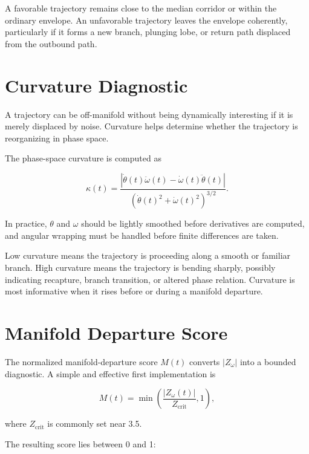 \documentclass[11pt]{article}
\begin{document}
A favorable trajectory remains close to the median corridor or within the ordinary envelope. An unfavorable trajectory leaves the envelope coherently, particularly if it forms a new branch, plunging lobe, or return path displaced from the outbound path.

\section{Curvature Diagnostic}

A trajectory can be off-manifold without being dynamically interesting if it is merely displaced by noise. Curvature helps determine whether the trajectory is reorganizing in phase space.

The phase-space curvature is computed as

\begin{equation}
\kappa(t) =
\frac{\left|\dot{\theta}(t)\ddot{\omega}(t)-\dot{\omega}(t)\ddot{\theta}(t)\right|}
{\left(\dot{\theta}(t)^2+\dot{\omega}(t)^2\right)^{3/2}}.
\end{equation}

In practice, \(\theta\) and \(\omega\) should be lightly smoothed before derivatives are computed, and angular wrapping must be handled before finite differences are taken.

Low curvature means the trajectory is proceeding along a smooth or familiar branch. High curvature means the trajectory is bending sharply, possibly indicating recapture, branch transition, or altered phase relation. Curvature is most informative when it rises before or during a manifold departure.

\section{Manifold Departure Score}

The normalized manifold-departure score \(M(t)\) converts \(|Z_{\omega}|\) into a bounded diagnostic. A simple and effective first implementation is

\begin{equation}
M(t) = \min\left(\frac{|Z_{\omega}(t)|}{Z_{\mathrm{crit}}},1\right),
\end{equation}

where \(Z_{\mathrm{crit}}\) is commonly set near 3.5.

The resulting score lies between 0 and 1:
\end{document}
